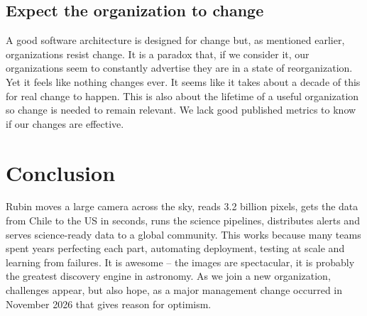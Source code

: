 \subsection{Expect the organization to change}

A good software architecture is designed for change but, as mentioned earlier, organizations resist change.
It is a paradox that, if we consider it, our organizations seem to constantly advertise they are in a state of reorganization.
Yet it feels like nothing changes ever.
It seems like it takes about a decade of this for real change to happen.
This is also about the lifetime of a useful organization so change is needed to remain relevant.
We lack good published metrics to know if our changes are effective.


\section{Conclusion}
\label{sec:conclusion}

Rubin moves a large camera across the sky, reads 3.2 billion pixels, gets the data from Chile to the US in seconds, runs the science pipelines, distributes alerts and serves science-ready data to a global community.
This works because many teams spent years perfecting each part, automating deployment, testing at scale and learning from failures.
It is awesome -- the images are spectacular, it is probably the greatest discovery engine in astronomy.
As we join a new organization, challenges appear, but also hope, as a major management change occurred in November 2026 that gives reason for optimism.

